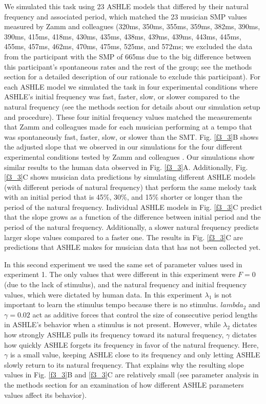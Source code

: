 \documentclass{report}
\begin{document}
We simulated this task using 23 ASHLE models that differed by their natural frequency and associated period, which matched the 23 musician SMP values measured by Zamm and colleagues \cite{zamm2018musicians} (320ms, 350ms, 355ms, 359ms, 382ms, 390ms, 390ms, 415ms, 418ms, 430ms, 435ms, 438ms, 439ms, 439ms, 443ms, 445ms, 455ms, 457ms, 462ms, 470ms, 475ms, 525ms, and 572ms; we excluded the data from the participant with the SMP of 665ms due to the big difference between this participant's spontaneous rates and the rest of the group; see the methods section for a detailed description of our rationale to exclude this participant). For each ASHLE model we simulated the task in four experimental conditions where ASHLE's initial frequency was fast, faster, slow, or slower compared to the natural frequency (see the methods section for details about our simulation setup and procedure). These four initial frequency values matched the measurements that Zamm and colleagues \cite{zamm2018musicians} made for each musician performing at a tempo that was spontaneously fast, faster, slow, or slower than the SMT. Fig.{} \ref{f3_3}B shows the adjusted slope that we observed in our simulations for the four different experimental conditions tested by Zamm and colleagues \cite{zamm2018musicians}. Our simulations show similar results to the human data observed in Fig.{} \ref{f3_3}A. Additionally, Fig.{} \ref{f3_3}C shows musician data predictions by simulating different ASHLE models (with different periods of natural frequency) that perform the same melody task with an initial period that is 45\%, 30\%, and 15\% shorter or longer than the period of the natural frequency. Individual ASHLE models in Fig.{} \ref{f3_3}C predict that the slope grows as a function of the difference between initial period and the period of the natural frequency. Additionally, a slower natural frequency predicts larger slope values compared to a faster one. The results in Fig.{} \ref{f3_3}C are predictions that ASHLE makes for musician data that has not been collected yet.

In this second experiment we used the same set of parameter values used in experiment 1. The only values that were different in this experiment were $F = 0$ (due to the lack of stimulus), and the natural frequency and initial frequency values, which were dictated by human data. In this experiment $\lambda_1$ is not important to learn the stimulus tempo because there is no stimulus. $lambda_2$ and $\gamma = 0.02$ act as additive forces that control the size of consecutive period lengths in ASHLE's behavior when a stimulus is not present. However, while $\lambda_2$ dictates how strongly ASHLE pulls its frequency toward its natural frequency, $\gamma$ dictates how quickly ASHLE forgets its frequency in favor of the natural frequency. Here, $\gamma$ is a small value, keeping ASHLE close to its frequency and only letting ASHLE slowly return to its natural frequency. That explains why the resulting slope values in Fig.{} \ref{f3_3}B and \ref{f3_3}C are relatively small (see parameter analysis in the methods section for an examination of how different ASHLE parameters values affect its behavior).
\end{document}
